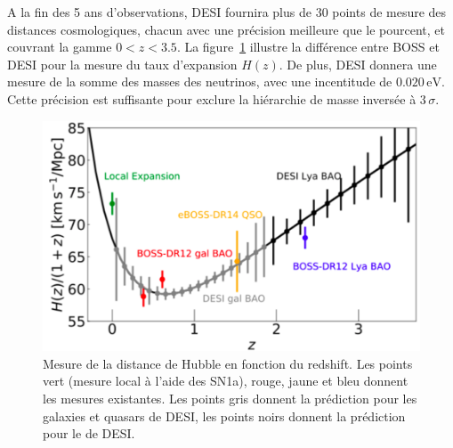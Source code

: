 A la fin des 5 ans d'observations, DESI fournira plus de 30 points de mesure des distances cosmologiques, chacun avec une précision meilleure que le pourcent, et couvrant la gamme $\num{0}< z < \num{3.5}$. La figure~\ref{fig:DesiVsEboss} illustre la différence entre BOSS et DESI pour la mesure du taux d'expansion $H(z)$.
De plus, DESI donnera une mesure de la somme des masses des neutrinos, avec une incentitude de $\num{0,020}\,\mathrm{eV}$. Cette précision est suffisante pour exclure la hiérarchie de masse inversée à $3\,\sigma$.


\begin{figure}
  \centering
  \includegraphics[scale=0.3]{DesiVsEboss}
  \caption{Mesure de la distance de Hubble en fonction du redshift. Les points vert (mesure local \`a l'aide des SN1a), rouge, jaune et bleu donnent les mesures existantes. Les points gris donnent la prédiction pour les galaxies et quasars de DESI, les points noirs donnent la prédiction pour le \lya{} de DESI.}
  \label{fig:DesiVsEboss}
\end{figure}

% 

